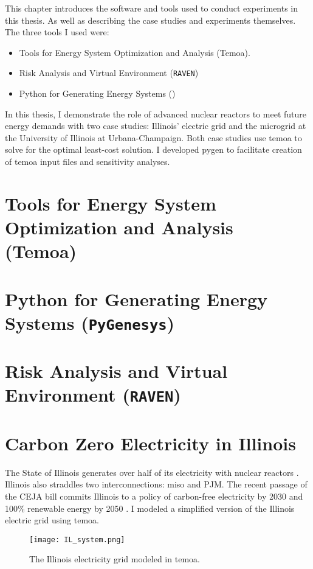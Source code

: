 This chapter introduces the software and tools used to conduct experiments in this
thesis. As well as describing the case studies and experiments themselves.
The three tools I used were:
\begin{itemize}
  \item Tools for Energy System Optimization and Analysis (Temoa).
  \item Risk Analysis and Virtual Environment (\texttt{RAVEN})
  \item Python for Generating Energy Systems (\pygen)
\end{itemize}
In this thesis, I demonstrate the role of advanced nuclear reactors to meet future
energy demands with two case studies: Illinois’ electric grid and the microgrid
at the University of Illinois at Urbana-Champaign. Both case studies use \gls{temoa}
to solve for the optimal least-cost solution. I developed \gls{pygen} to
facilitate creation of \gls{temoa} input files and sensitivity analyses.

\section{Tools for Energy System Optimization and Analysis (Temoa)}


\section{Python for Generating Energy Systems (\texttt{PyGenesys})}

\section{Risk Analysis and Virtual Environment (\texttt{RAVEN})}


\section{Carbon Zero Electricity in Illinois}
\label{section:ilmodel}
The State of Illinois generates over half of its electricity with nuclear reactors
\cite{energy_information_administration_eia_nodate}.
Illinois also straddles two interconnections: \gls{miso} and PJM. The recent
passage of the CEJA bill commits Illinois to a policy of carbon-free electricity
by 2030 and 100\% renewable energy by 2050 \cite{harmon_climate_2021}.
I modeled a simplified version of the Illinois electric grid using \gls{temoa}.

\begin{figure}[H]
  \centering
  \texttt{[image: IL\_system.png]}
  \caption{The Illinois electricity grid modeled in \gls{temoa}.}
  \label{fig:ilsys}
\end{figure}

